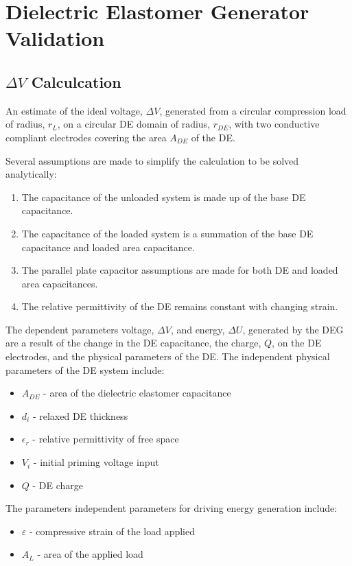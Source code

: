 \chapter{Dielectric Elastomer Generator Validation}
\label{appendix-F}

\section{$\Delta V$ Calculcation}
An estimate of the ideal voltage, $\Delta V$, generated from a circular compression load of radius, $r_L$, on a circular DE domain of radius, $r_{DE}$, with two conductive compliant electrodes covering the area $A_{DE}$ of the DE.

Several assumptions are made to simplify the calculation to be solved analytically:
\begin{enumerate}
	\item The capacitance of the unloaded system is made up of the base DE capacitance.
	\item The capacitance of the loaded system is a summation of the base DE capacitance and loaded area capacitance.
	\item The parallel plate capacitor assumptions are made for both DE and loaded area capacitances.
	\item The relative permittivity of the DE remains constant with changing strain.
\end{enumerate}

The dependent parameters voltage, $\Delta V$, and energy, $\Delta U$, generated by the DEG are a result of the change in the DE capacitance, the charge, $Q$, on the DE electrodes, and the physical parameters of the DE. The independent physical parameters of the DE system include:
\begin{itemize}
	\item $A_{DE}$ - area of the dielectric elastomer capacitance
	\item $d_i$ - relaxed DE thickness
	\item $\epsilon_r$ - relative permittivity of free space
	\item $V_i$ - initial priming voltage input
	\item $Q$ - DE charge
\end{itemize}
The parameters independent parameters for driving energy generation include:
\begin{itemize}
	\item $\varepsilon$ - compressive strain of the load applied
	\item $A_L$ - area of the applied load
\end{itemize}

